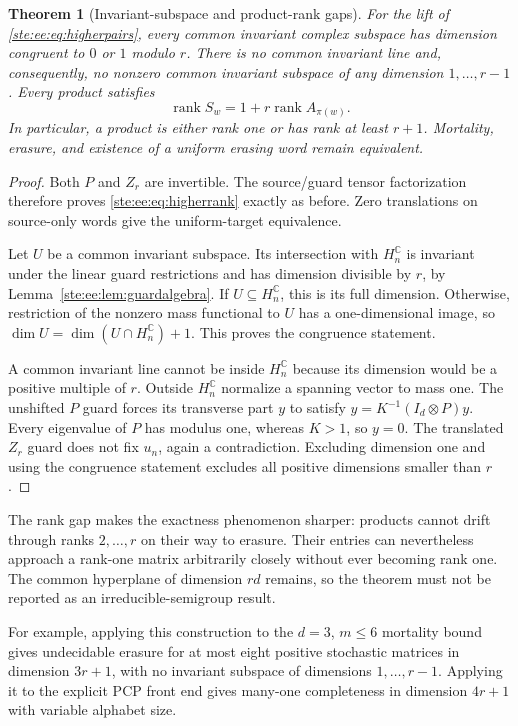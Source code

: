 \documentclass[11pt,letterpaper]{article}
\newtheorem{theorem}{Theorem}[section]
\theoremstyle{definition}
\theoremstyle{remark}
\newcommand{\C}{\mathbb C}
\newcommand{\rk}{\operatorname{rank}}
\begin{document}
\begin{theorem}[Invariant-subspace and product-rank gaps]\label{ste:ee:thm:higher}
For the lift of \eqref{ste:ee:eq:higherpairs}, every common invariant complex subspace
has dimension congruent to $0$ or $1$ modulo $r$. There is no common invariant
line and, consequently, no nonzero common invariant subspace of any dimension
$1,\ldots,r-1$. Every product satisfies
\begin{equation}
 \rk S_w=1+r\rk A_{\pi(w)}.
 \label{ste:ee:eq:higherrank}
\end{equation}
In particular, a product is either rank one or has rank at least $r+1$.
Mortality, erasure, and existence of a uniform erasing word remain equivalent.
\end{theorem}
\begin{proof}
Both $P$ and $Z_r$ are invertible. The source/guard tensor factorization therefore
proves \eqref{ste:ee:eq:higherrank} exactly as before. Zero translations on source-only
words give the uniform-target equivalence.

Let $U$ be a common invariant subspace. Its intersection with $H_n^{\C}$ is
invariant under the linear guard restrictions and has dimension divisible by
$r$, by Lemma~\ref{ste:ee:lem:guardalgebra}. If $U\subseteq H_n^{\C}$, this is its
full dimension. Otherwise, restriction of the nonzero mass functional to $U$
has a one-dimensional image, so
$\dim U=\dim(U\cap H_n^{\C})+1$. This proves the congruence statement.

A common invariant line cannot be inside $H_n^{\C}$ because its dimension would
be a positive multiple of $r$. Outside $H_n^{\C}$ normalize a spanning vector to
mass one. The unshifted $P$ guard forces its transverse part $y$ to satisfy
$y=K^{-1}(I_d\otimes P)y$. Every eigenvalue of $P$ has modulus one, whereas
$K>1$, so $y=0$. The translated $Z_r$ guard does not fix $u_n$, again a
contradiction. Excluding dimension one and using the congruence statement
excludes all positive dimensions smaller than $r$.
\end{proof}

The rank gap makes the exactness phenomenon sharper: products cannot drift
through ranks $2,\ldots,r$ on their way to erasure. Their entries can nevertheless
approach a rank-one matrix arbitrarily closely without ever becoming rank one.
The common hyperplane of dimension $rd$ remains, so the theorem must not be
reported as an irreducible-semigroup result.

For example, applying this construction to the $d=3$, $m\leq6$ mortality bound
gives undecidable erasure for at most eight positive stochastic matrices in
dimension $3r+1$, with no invariant subspace of dimensions $1,\ldots,r-1$.
Applying it to the explicit PCP front end gives many-one completeness in
dimension $4r+1$ with variable alphabet size.
\end{document}
